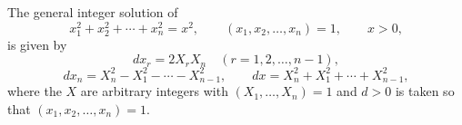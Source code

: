 \begin{proposition}
The general integer solution of
\[
    x_1^2+x_2^2+\cdots+x_n^2=x^2,\qquad (x_1,x_2,\ldots,x_n)=1,\qquad x>0,
\]
is given by
\[
    dx_r=2X_rX_n\quad(r=1,2,\ldots,n-1),
\]
\[
    dx_n=X_n^2-X_1^2-\cdots-X_{n-1}^2,\qquad
    dx=X_n^2+X_1^2+\cdots+X_{n-1}^2,
\]
where the $X$ are arbitrary integers with $(X_1,\ldots,X_n)=1$ and $d>0$ is
taken so that $(x_1,x_2,\ldots,x_n)=1$.
\end{proposition}
